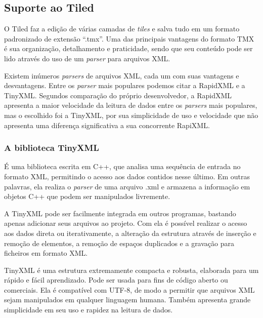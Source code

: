 \subsection{Suporte ao Tiled}
%
O Tiled faz a edição de várias camadas de \textit{tiles} e salva tudo em um formato padronizado de extensão ``.tmx''. Uma das principais vantagens do formato TMX é sua organização, detalhamento e praticidade, sendo que seu conteúdo pode ser lido através do uso de um \textit{parser} para arquivos XML.
\par 
Existem inúmeros \textit{parsers} de arquivos XML, cada um com suas vantagens e desvantagens. Entre os \textit{parser} mais populares podemos citar a RapidXML e a TinyXML. Segundos comparação do próprio desenvolvedor, a RapidXML apresenta a maior velocidade da leitura de dados entre os \textit{parsers} mais populares, mas o escolhido foi a TinyXML, por sua simplicidade de uso e velocidade que não apresenta uma diferença significativa a sua concorrente RapiXML. 
%
%
\subsubsection{A biblioteca TinyXML}
\label{tinyXML}
%
É uma biblioteca escrita em C++, que analisa uma sequência de entrada no formato XML, permitindo o acesso aos dados contidos nesse último. Em outras palavras, ela realiza o \textit{parser} de uma arquivo .xml e armazena a informação em objetos C++ que podem ser manipulados livremente. 
\par 
A TinyXML \cite{TinyXMLTutorial} pode ser facilmente integrada em outros programas, bastando apenas adicionar seus arquivos ao projeto. Com ela é possível realizar o acesso aos dados direta ou iterativamente, a alteração da estrutura através 
de inserção e remoção de elementos, a remoção de espaços duplicados e a gravação para ficheiros em formato XML.

TinyXML é uma estrutura extremamente compacta e robusta, elaborada para um rápido e fácil aprendizado. Pode ser usada para fins de código aberto ou comerciais. Ela é compatível com UTF-8, de modo a permitir que arquivos XML sejam manipulados em qualquer linguagem humana. Também apresenta grande simplicidade em seu uso e rapidez na leitura de dados.
%
%

